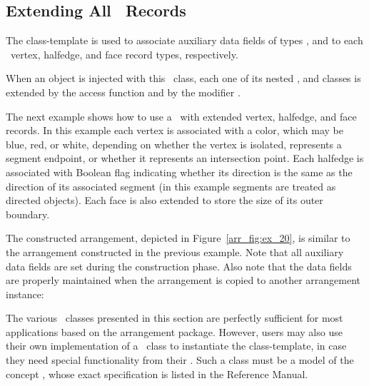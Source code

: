 
\subsection{Extending All \dcel\ Records\label{arr_ssec:ex_dcel_all}}

The 
class-template is used to associate auxiliary data fields of
types  , and  to
each \dcel\ vertex, halfedge, and face record types, respectively.

When an  object is injected with this
\dcel\ class, each one of its nested ,  and
 classes is extended by the access function 
and by the modifier .

The next example shows how to use a \dcel\ with extended vertex,
halfedge, and face records. In this example each vertex is associated 
with a color, which may be blue, red, or white, depending on whether the
vertex is isolated, represents a segment endpoint, or whether it
represents an intersection point. Each halfedge is associated with
Boolean flag indicating whether its direction is the same as the
direction of its associated segment (in this example segments are
treated as directed objects). Each face is also extended to store the
size of its outer boundary.

The constructed arrangement, depicted in Figure~\ref{arr_fig:ex_20}, is 
similar to the arrangement constructed in the previous example. 
Note that all auxiliary data fields are set during the construction phase.
Also note that the data fields are properly maintained when the arrangement
is copied to another arrangement instance:
 

\begin{ccAdvanced}
The various \dcel\ classes presented in this section are perfectly
sufficient for most applications based on the arrangement package.
However, users may also use their own implementation of a \dcel\ class
to instantiate the  class-template, in case they need
special functionality from their \dcel. Such a class must be a model of the
concept , whose exact specification is listed in the
Reference Manual.
\end{ccAdvanced}
